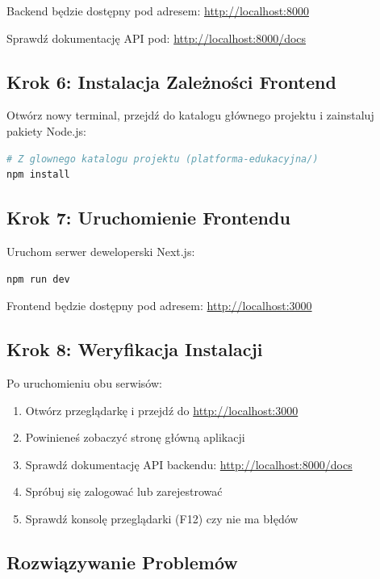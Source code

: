 \documentclass[12pt,a4paper]{article}
\begin{document}
Backend będzie dostępny pod adresem: \url{http://localhost:8000}

Sprawdź dokumentację API pod: \url{http://localhost:8000/docs}

\subsection{Krok 6: Instalacja Zależności Frontend}

Otwórz nowy terminal, przejdź do katalogu głównego projektu i zainstaluj pakiety Node.js:

\begin{lstlisting}[language=bash]
# Z glownego katalogu projektu (platforma-edukacyjna/)
npm install
\end{lstlisting}

\subsection{Krok 7: Uruchomienie Frontendu}

Uruchom serwer deweloperski Next.js:

\begin{lstlisting}[language=bash]
npm run dev
\end{lstlisting}

Frontend będzie dostępny pod adresem: \url{http://localhost:3000}

\subsection{Krok 8: Weryfikacja Instalacji}

Po uruchomieniu obu serwisów:

\begin{enumerate}
    \item Otwórz przeglądarkę i przejdź do \url{http://localhost:3000}
    \item Powinieneś zobaczyć stronę główną aplikacji
    \item Sprawdź dokumentację API backendu: \url{http://localhost:8000/docs}
    \item Spróbuj się zalogować lub zarejestrować
    \item Sprawdź konsolę przeglądarki (F12) czy nie ma błędów
\end{enumerate}

\subsection{Rozwiązywanie Problemów}
\end{document}
